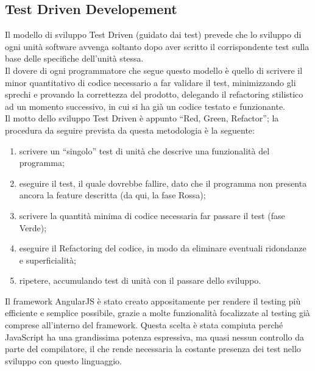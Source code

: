 \subsection{Test Driven Developement}
Il modello di sviluppo Test Driven (guidato dai test) prevede che lo sviluppo di ogni unità software avvenga soltanto dopo aver scritto il corrispondente test sulla base delle specifiche dell’unità stessa.\\
Il dovere di ogni programmatore che segue questo modello è quello di scrivere il minor quantitativo di codice necessario a far validare il test, minimizzando gli sprechi e provando la correttezza del prodotto, delegando il refactoring stilistico ad un momento successivo, in cui si ha già un codice testato e funzionante.\\
Il motto dello sviluppo Test Driven è appunto “Red, Green, Refactor”; la procedura da seguire prevista da questa metodologia è la seguente:
\begin{enumerate}
	\item scrivere un “singolo” test di unità che descrive una funzionalità del programma;
	\item eseguire il test, il quale dovrebbe fallire, dato che il programma non presenta ancora la feature descritta (da qui, la fase Rossa);
	\item scrivere la quantità minima di codice necessaria far passare il test (fase Verde);
	\item eseguire il Refactoring del codice, in modo da eliminare eventuali ridondanze e superficialità;
	\item ripetere, accumulando test di unità con il passare dello sviluppo.
\end{enumerate}
Il framework AngularJS è stato creato appositamente per rendere il testing più efficiente e semplice possibile, grazie a molte funzionalità focalizzate al testing già comprese all’interno del framework. Questa scelta è stata compiuta perché JavaScript ha una grandissima potenza espressiva, ma quasi nessun controllo da parte del compilatore, il che rende necessaria la costante presenza dei test nello sviluppo con questo linguaggio.
